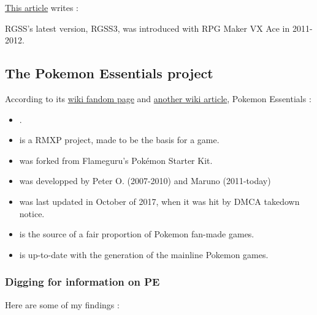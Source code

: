 \documentclass[11pt]{article}
\begin{document}
\href{https://rmvxace.fandom.com/wiki/RGSS}{This article} writes : 


RGSS's latest version, RGSS3, was introduced with RPG Maker VX Ace in 2011-2012.






\subsection{The Pokemon Essentials project}


According to its \href{https://essentialsdocs.fandom.com/wiki/Essentials_Docs_Wiki}{wiki fandom page} and \href{https://pokemon-fan-game.fandom.com/wiki/Pok\%C3\%A9mon_Essentials}{another wiki article}, Pokemon Essentials : 

\begin{itemize}
	\item {}.
	\item is a RMXP project, made to be the basis for a game.
	\item was forked from Flameguru's Pokémon Starter Kit.
	\item was developped by Peter O. (2007-2010) and Maruno (2011-today)
	\item was last updated in October of 2017, when it was hit by DMCA takedown notice.
	\item is the source of a fair proportion of Pokemon fan-made games.
	\item is up-to-date with the  generation of the mainline Pokemon games.
\end{itemize}


\subsubsection{Digging for information on PE}

Here are some of my findings :
\end{document}
